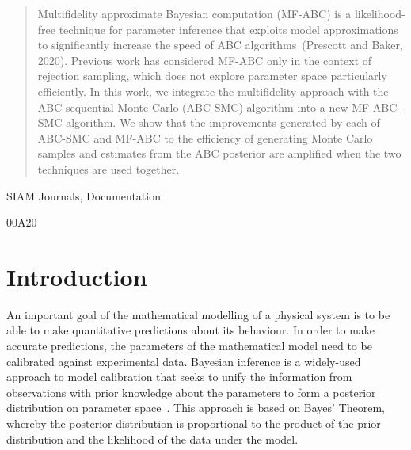 \documentclass[review,demo]{siamonline190516}
\begin{document}
\maketitle{}

\begin{abstract}
Multifidelity approximate Bayesian computation (MF-ABC) is a likelihood-free technique for parameter inference that exploits model approximations to significantly increase the speed of ABC algorithms~(Prescott and Baker, 2020).
Previous work has considered MF-ABC only in the context of rejection sampling, which does not explore parameter space particularly efficiently.
In this work, we integrate the multifidelity approach with the ABC sequential Monte Carlo (ABC-SMC) algorithm into a new MF-ABC-SMC algorithm.
We show that the improvements generated by each of ABC-SMC and MF-ABC to the efficiency of generating Monte Carlo samples and estimates from the ABC posterior are amplified when the two techniques are used together.
\end{abstract}

\begin{keywords}
SIAM Journals, Documentation
\end{keywords}

\begin{AMS}
00A20
\end{AMS}

\section{Introduction}
\label{s:Intro}

An important goal of the mathematical modelling of a physical system is to be able to make quantitative predictions about its behaviour.
In order to make accurate predictions, the parameters of the mathematical model need to be calibrated against experimental data.
Bayesian inference is a widely-used approach to model calibration that seeks to unify the information from observations with prior knowledge about the parameters to form a posterior distribution on parameter space~\cite{Beaumont2010,Hines2015,Schnoerr2017}.
This approach is based on Bayes' Theorem, whereby the posterior distribution is proportional to the product of the prior distribution and the likelihood of the data under the model.
\end{document}
